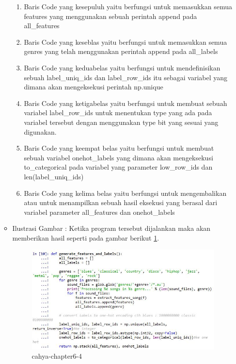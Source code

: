 \begin{enumerate}
\begin{itemize}
\begin{enumerate}
\item Baris Code yang kesepuluh yaitu berfungsi untuk memasukkan semua features yang menggunakan sebuah perintah append pada all\_features
\item Baris Code yang keseblas yaitu berfungsi untuk memasukkan semua genres yang telah menggunakan perintah append pada all\_labels
\item Baris Code yang keduabelas yaitu berfungsi untuk mendefinisikan sebuah label\_uniq\_ids dan label\_row\_ids itu sebagai variabel yang dimana akan mengeksekusi perintah np.unique
\item Baris Code yang ketigabelas yaitu berfungsi untuk membuat sebuah variabel label\_row\_ids untuk menentukan type yang ada pada variabel tersebut dengan menggunakan type bit yang sesuai yang digunakan.
\item Baris Code yang keempat belas yaitu berfungsi untuk membuat sebuah variabel onehot\_labels yang dimana akan mengeksekusi to\_categorical pada variabel yang parameter low\_row\_ids dan len(label\_uniq\_ids)
\item Baris Code yang kelima belas yaitu berfungsi untuk mengembalikan atau untuk menampilkan sebuah hasil eksekusi yang berasal dari variabel parameter all\_features dan onehot\_labels
\end{enumerate}
\par
\item Ilustrasi Gambar : Ketika program tersebut dijalankan maka akan memberikan hasil seperti pada gambar berikut \ref{cahya-chapter6-4}.
\par
\begin{figure}[!hbtp]
\centering
\includegraphics[scale=0.2]{figures/cahya-chapter6-4.jpg}
\caption{cahya-chapter6-4}
\label{cahya-chapter6-4}
\end{figure}
\par

\end{itemize}
\end{enumerate}
